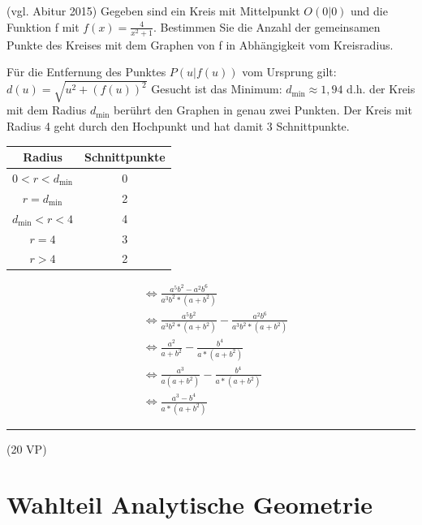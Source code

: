 \aufgabe{} (vgl. Abitur 2015)
Gegeben sind ein Kreis mit Mittelpunkt $O(0|0)$ und die Funktion f mit $f(x)=\frac{4}{x^2+1}$. Bestimmen Sie die Anzahl der gemeinsamen Punkte des Kreises mit dem Graphen von f in Abhängigkeit vom Kreisradius.

\begin{lsg}{}
Für die Entfernung des Punktes $P(u|f(u))$ vom Ursprung gilt:
$d(u)=\sqrt{u^2+(f(u))^2}$ Gesucht ist das Minimum:
$d_{\mathrm{min}}\approx 1,94$ d.h. der Kreis mit dem Radius $d_{\mathrm{min}}$ berührt den Graphen in genau zwei Punkten.
Der Kreis mit Radius 4 geht durch den Hochpunkt und hat damit 3 Schnittpunkte.

\bigskip
\noindent
\begin{tabular}{c | c}
  Radius & Schnittpunkte\\
  \hline $0<r<d_{\mathrm{min}}$ & 0\\
  $r=d_{\mathrm{min}}$ & 2\\
  $d_{\mathrm{min}}<r<4$ & 4\\
  $r=4$ & 3\\
  $r>4$ & 2
\end{tabular}
\end{lsg}

\aufgabe{}



\vfill
\begin{align*}
	&\Leftrightarrow\frac{a^5b^2-a^2b^6}{a^3b^2*(a+b^2)}\\
	&\Leftrightarrow\frac{a^5b^2}{a^3b^2*(a+b^2)}-\frac{a^2b^6}{a^3b^2*(a+b^2)}\\
	&\Leftrightarrow\frac{a^2}{a+b^2}-\frac{b^4}{a*(a+b^2)}\\
	&\Leftrightarrow\frac{a^3}{a(a+b^2)}-\frac{b^4}{a*(a+b^2)}\\
	&\Leftrightarrow\frac{a^3-b^4}{a*(a+b^2)}
\end{align*}



\vfill

\hfill\rule{1.5cm}{0.4mm}

\hfill (20 VP)\hspace{0.22cm}





\section{Wahlteil Analytische Geometrie}

